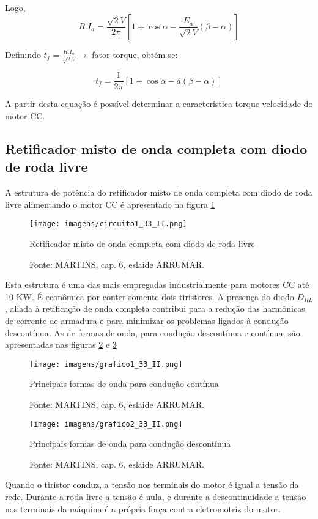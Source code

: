 Logo,
\[R.I_{a} = \frac{\sqrt{2}V}{2\pi}\left[1 + \cos{\alpha} - \frac{E_{a}}{\sqrt{2}V}\left(\beta - \alpha\right)\right]\]

Definindo $t_{f} = \frac{R.I_{a}}{\sqrt{2}V} \rightarrow$ fator torque, obtém-se:

\[t_{f} = \frac{1}{2\pi}\left[1 + \cos{\alpha} - a\left(\beta - \alpha\right)\right]\]

A partir desta equação é possível determinar a característica torque-velocidade do motor CC.

\subsection{Retificador misto de onda completa com diodo de roda livre}

A estrutura de potência do retificador misto de onda completa com diodo de roda livre alimentando o motor CC é apresentado na figura \ref{fig:C1-33-II}

\begin{figure}[ht!]
\center
\texttt{[image: imagens/circuito1\_33\_II.png]}
\caption{\label{fig:C1-33-II} Retificador misto de onda completa com diodo de roda livre}
\caption*{Fonte: MARTINS, cap. 6, eslaide ARRUMAR.}
\end{figure}

Esta estrutura é uma das mais empregadas industrialmente para motores CC até 10 KW. É econômica por conter somente dois tiristores. A presença do diodo $D_{RL}$, aliada à retificação de onda completa contribui para a redução das harmônicas de corrente de armadura e para minimizar os problemas ligados à condução descontínua. As de formas de onda, para condução descontínua e contínua, são apresentadas nas figuras \ref{fig:G1-33-II} e \ref{fig:G2-33-II}

\begin{figure}[ht!]
\center
\texttt{[image: imagens/grafico1\_33\_II.png]}
\caption{\label{fig:G1-33-II} Principais formas de onda para condução contínua}
\caption*{Fonte: MARTINS, cap. 6, eslaide ARRUMAR.}
\end{figure}

\begin{figure}[ht!]
\center
\texttt{[image: imagens/grafico2\_33\_II.png]}
\caption{\label{fig:G2-33-II} Principais formas de onda para condução descontínua}
\caption*{Fonte: MARTINS, cap. 6, eslaide ARRUMAR.}
\end{figure}

Quando o tiristor conduz, a tensão nos terminais do motor é igual a tensão da rede. Durante a roda livre a tensão é nula, e durante a descontinuidade a tensão nos terminais da máquina é a própria força contra eletromotriz do motor.


